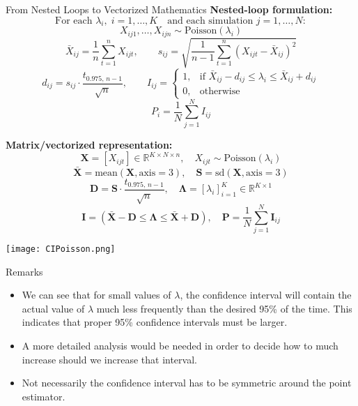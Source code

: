 \documentclass[8pt]{beamer}
\begin{document}
\begin{frame}{From Nested Loops to Vectorized Mathematics}
\small
\textbf{Nested-loop formulation:}
\[
\text{For each } \lambda_i,\; i=1,\ldots,K \quad 
\text{and each simulation } j=1,\ldots,N:
\]
\[
X_{ij1}, \ldots, X_{ijn} \sim \text{Poisson}(\lambda_i)
\]
\[
\bar{X}_{ij} = \frac{1}{n}\sum_{t=1}^{n} X_{ijt}, \qquad
s_{ij} = \sqrt{\frac{1}{n-1}\sum_{t=1}^{n} (X_{ijt}-\bar{X}_{ij})^2}
\]
\[
d_{ij} = s_{ij} \cdot \frac{t_{0.975,\, n-1}}{\sqrt{n}}, \qquad
I_{ij} = 
\begin{cases}
1, & \text{if } \bar{X}_{ij} - d_{ij} \leq \lambda_i \leq \bar{X}_{ij} + d_{ij} \\
0, & \text{otherwise}
\end{cases}
\]
\[
P_i = \frac{1}{N}\sum_{j=1}^{N} I_{ij}
\]

\vspace{0.5em}
\textbf{Matrix/vectorized representation:}
\[
\mathbf{X} = [X_{ijt}] \in \mathbb{R}^{K \times N \times n}, \quad X_{ijt} \sim \text{Poisson}(\lambda_i)
\]
\[
\bar{\mathbf{X}} = \text{mean}(\mathbf{X}, \text{axis}=3), \quad
\mathbf{S} = \text{sd}(\mathbf{X}, \text{axis}=3)
\]
\[
\mathbf{D} = \mathbf{S} \cdot \frac{t_{0.975,\, n-1}}{\sqrt{n}}, \quad
\boldsymbol{\Lambda} = [\lambda_i]_{i=1}^{K} \in \mathbb{R}^{K \times 1}
\]
\[
\mathbf{I} = (\bar{\mathbf{X}} - \mathbf{D} \leq \boldsymbol{\Lambda} \leq \bar{\mathbf{X}} + \mathbf{D}), \quad
\mathbf{P} = \frac{1}{N} \sum_{j=1}^{N} \mathbf{I}_{ij}
\]
\end{frame}

\begin{frame}
\begin{center}
\texttt{[image: CIPoisson.png]}
\end{center}
\end{frame}

\begin{frame}{Remarks}
\begin{itemize}
	\item We can see that for small values of $\lambda$, the confidence interval will contain the actual value of $\lambda$ much less frequently than the desired 95\% of the time. This indicates that proper 95\% confidence intervals must be larger.
	\item A more detailed analysis would be needed in  order to decide how to much increase should we increase that interval.
	\item Not necessarily the confidence interval has to be symmetric around the point estimator. 
\end{itemize}
\end{frame}
\end{document}
